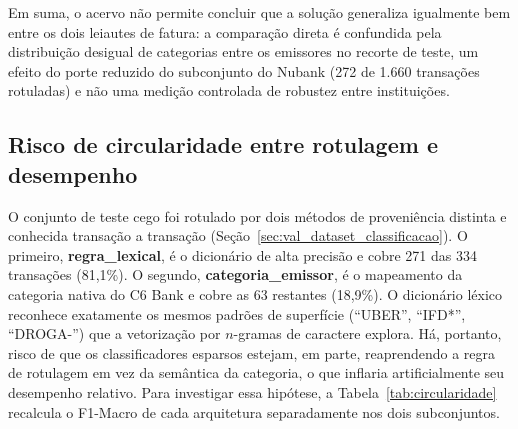 Em suma, o acervo não permite concluir que a solução generaliza igualmente bem entre os dois leiautes de fatura: a comparação direta é confundida pela distribuição desigual de categorias entre os emissores no recorte de teste, um efeito do porte reduzido do subconjunto do Nubank (272 de 1.660 transações rotuladas) e não uma medição controlada de robustez entre instituições.

\subsection{Risco de circularidade entre rotulagem e desempenho}
\label{sec:val_circularidade}

O conjunto de teste cego foi rotulado por dois métodos de proveniência distinta e conhecida transação a transação (Seção~\ref{sec:val_dataset_classificacao}). O primeiro, \textbf{regra\_lexical}, é o dicionário de alta precisão e cobre 271 das 334 transações (81,1\%). O segundo, \textbf{categoria\_emissor}, é o mapeamento da categoria nativa do C6 Bank e cobre as 63 restantes (18,9\%). O dicionário léxico reconhece exatamente os mesmos padrões de superfície (``UBER'', ``IFD*'', ``DROGA-'') que a vetorização por $n$-gramas de caractere explora. Há, portanto, risco de que os classificadores esparsos estejam, em parte, reaprendendo a regra de rotulagem em vez da semântica da categoria, o que inflaria artificialmente seu desempenho relativo. Para investigar essa hipótese, a Tabela~\ref{tab:circularidade} recalcula o F1-Macro de cada arquitetura separadamente nos dois subconjuntos.

\begin{table}[htb]
\centering
\caption{F1-Macro por arquitetura, segmentado pela proveniência do rótulo de referência.}
\label{tab:circularidade}
\end{table}

